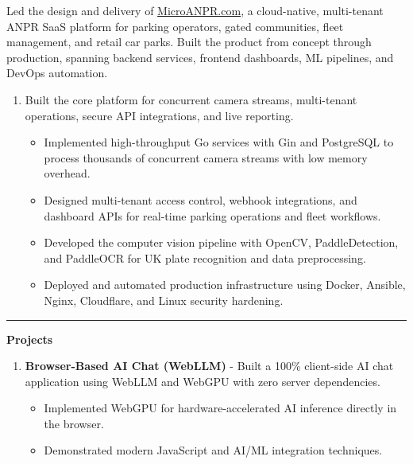 \documentclass{article}
\begin{document}
Led the design and delivery of \href{https://microanpr.com}{MicroANPR.com}, a cloud-native, multi-tenant ANPR SaaS platform for parking operators, gated communities, fleet management, and retail car parks. Built the product from concept through production, spanning backend services, frontend dashboards, ML pipelines, and DevOps automation.

\begin{enumerate}
    \item[] Built the core platform for concurrent camera streams, multi-tenant operations, secure API integrations, and live reporting.
   \begin{itemize}
    \item Implemented high-throughput Go services with Gin and PostgreSQL to process thousands of concurrent camera streams with low memory overhead.
    \item Designed multi-tenant access control, webhook integrations, and dashboard APIs for real-time parking operations and fleet workflows.
    \item Developed the computer vision pipeline with OpenCV, PaddleDetection, and PaddleOCR for UK plate recognition and data preprocessing.
    \item Deployed and automated production infrastructure using Docker, Ansible, Nginx, Cloudflare, and Linux security hardening.
   \end{itemize}
\end{enumerate}






\vspace{6.9em}
\hrule 
\vspace{6.4em}
\hspace{-2.em}
{\bf Projects } \hfill %


\begin{enumerate}
    \item \textbf{Browser-Based AI Chat (WebLLM)} - Built a 100\% client-side AI chat application using WebLLM and WebGPU with zero server dependencies.
   \begin{itemize}
    \item Implemented WebGPU for hardware-accelerated AI inference directly in the browser.
    \item Demonstrated modern JavaScript and AI/ML integration techniques.
   \end{itemize}
\end{enumerate}
\end{document}
